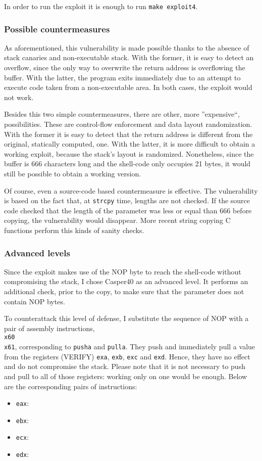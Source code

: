 In order to run the exploit it is enough to run \texttt{make exploit4}.

\subsubsection{Possible countermeasures}
As aforementioned, this vulnerability is made possible thanks to the absence of stack canaries and non-executable stack. With the former, it is easy to detect an overflow, since the only way to overwrite the return address is overflowing the buffer. With the latter, the program exits immediately due to an attempt to execute code taken from a non-executable area. In both cases, the exploit would not work. 

Besides this two simple countermeasures, there are other, more ''expensive``, possibilities. These are control-flow enforcement and data layout randomization. With the former it is easy to detect that the return address is different from the original, statically computed, one. With the latter, it is more difficult to obtain a working exploit, because the stack's layout is randomized. Nonetheless, since the buffer is 666 characters long and the shell-code only occupies 21 bytes, it would still be possible to obtain a working version.

Of course, even a source-code based countermeasure is effective. The vulnerability is based on the fact that, at \texttt{strcpy} time, lengths are not checked. If the source code checked that the length of the parameter was less or equal than 666 before copying, the vulnerability would disappear. More recent string copying C functions perform this kinds of sanity checks.

\subsubsection{Advanced levels}
Since the exploit makes use of the NOP byte to reach the shell-code without compromising the stack, I chose Casper40 as an advanced level. It performs an additional check, prior to the copy, to make sure that the parameter does not contain NOP bytes. 

To counterattack this level of defense, I substitute the sequence of NOP with a pair of assembly instructions, \texttt{\\x60\\x61}, corresponding to \texttt{pusha} and \texttt{pulla}. They push and immediately pull a value from the registers (VERIFY) \texttt{exa}, \texttt{exb}, \texttt{exc} and \texttt{exd}. Hence, they have no effect and do not compromise the stack. Please note that it is not necessary to push and pull to all of those registers: working only on one would be enough. Below are the corresponding pairs of instructions:
\begin{itemize}
	\item \texttt{eax}: 
	\item \texttt{ebx}: 
	\item \texttt{ecx}: 
	\item \texttt{edx}: 
\end{itemize}

